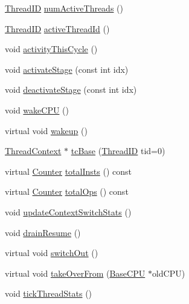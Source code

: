 \begin{DoxyCompactItemize}
\item 
\hyperlink{base_2types_8hh_ab39b1a4f9dad884694c7a74ed69e6a6b}{ThreadID} \hyperlink{classInOrderCPU_a8e60aca1dc5b29bde283a916f34bc944}{numActiveThreads} ()
\item 
\hyperlink{base_2types_8hh_ab39b1a4f9dad884694c7a74ed69e6a6b}{ThreadID} \hyperlink{classInOrderCPU_afd3a99df15e8ddc77ec8615ca02fcb4a}{activeThreadId} ()
\item 
void \hyperlink{classInOrderCPU_ad7e5c2506873e8dc8c71740ac6dabb23}{activityThisCycle} ()
\item 
void \hyperlink{classInOrderCPU_a9039dad8d295c41b50eba0342e6c11c0}{activateStage} (const int idx)
\item 
void \hyperlink{classInOrderCPU_a4d73bea02eaf6f93e267391592556fe7}{deactivateStage} (const int idx)
\item 
void \hyperlink{classInOrderCPU_abce3a63b123f84972e4df7962f9b870e}{wakeCPU} ()
\item 
virtual void \hyperlink{classInOrderCPU_ae674290a26ecbd622c5160e38e8a4fe9}{wakeup} ()
\item 
\hyperlink{classThreadContext}{ThreadContext} $\ast$ \hyperlink{classInOrderCPU_a1f4a6bd6bfbb29196452b0dfa68b1c9e}{tcBase} (\hyperlink{base_2types_8hh_ab39b1a4f9dad884694c7a74ed69e6a6b}{ThreadID} tid=0)
\item 
virtual \hyperlink{base_2types_8hh_ae1475755791765b8e6f6a8bb091e273e}{Counter} \hyperlink{classInOrderCPU_abdcc0de01ff3d8d22a40e0b966acb463}{totalInsts} () const 
\item 
virtual \hyperlink{base_2types_8hh_ae1475755791765b8e6f6a8bb091e273e}{Counter} \hyperlink{classInOrderCPU_adfb528b512cf037ade8dc8e22bf8a7bd}{totalOps} () const 
\item 
void \hyperlink{classInOrderCPU_a18e33751f284bf73d45d25224e93e6a0}{updateContextSwitchStats} ()
\item 
void \hyperlink{classInOrderCPU_a8f020d3237536fe007fc488c4125c5d8}{drainResume} ()
\item 
virtual void \hyperlink{classInOrderCPU_a05f299b443f8cc73a93d61572edc0218}{switchOut} ()
\item 
virtual void \hyperlink{classInOrderCPU_a9d27673c51f2406024ca1ce8ff2de4fb}{takeOverFrom} (\hyperlink{classBaseCPU_1_1BaseCPU}{BaseCPU} $\ast$oldCPU)
\item 
void \hyperlink{classInOrderCPU_a26221581dfe16c4d345ea2913d5d4d2f}{tickThreadStats} ()
\end{DoxyCompactItemize}
